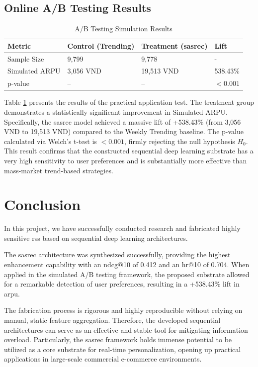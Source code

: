 \documentclass[conference]{IEEEtran}
\begin{document}
\subsection{Online A/B Testing Results}
\begin{table}[htb]
\centering
\renewcommand{\arraystretch}{1.35}
\setlength{\tabcolsep}{5pt}
\begin{tabular}{|>{\raggedright\arraybackslash}p{2cm}|p{2.15cm}|p{2.4cm}|p{1cm}|}
\hline
Metric & Control (Trending) & Treatment (\gls{sasrec}) & Lift \\ \hline
Sample Size & 9,799 & 9,778 & - \\
Simulated ARPU & 3,056 VND & 19,513 VND & 538.43\% \\
p-value & -- & -- & $< 0.001$ \\
\hline
\end{tabular}
\caption{A/B Testing Simulation Results}
\label{tab:ab_results}
\end{table}

Table \ref{tab:ab_results} presents the results of the practical application test. The treatment group demonstrates a statistically significant improvement in Simulated ARPU. Specifically, the \gls{sasrec} model achieved a massive lift of +538.43\% (from 3,056 VND to 19,513 VND) compared to the Weekly Trending baseline. The p-value calculated via Welch's t-test is $< 0.001$, firmly rejecting the null hypothesis $H_0$. This result confirms that the constructed sequential deep learning substrate has a very high sensitivity to user preferences and is substantially more effective than mass-market trend-based strategies.

\section{Conclusion}
In this project, we have successfully conducted research and fabricated highly sensitive \glspl{rs} based on sequential deep learning architectures. 

The \gls{sasrec} architecture was synthesized successfully, providing the highest enhancement capability with an \gls{ndcg}@10 of 0.412 and an \gls{hr}@10 of 0.704. When applied in the simulated A/B testing framework, the proposed substrate allowed for a remarkable detection of user preferences, resulting in a +538.43\% lift in \gls{arpu}. 

The fabrication process is rigorous and highly reproducible without relying on manual, static feature aggregation. Therefore, the developed sequential architectures can serve as an effective and stable tool for mitigating information overload. Particularly, the \gls{sasrec} framework holds immense potential to be utilized as a core substrate for real-time personalization, opening up practical applications in large-scale commercial e-commerce environments.
\end{document}
